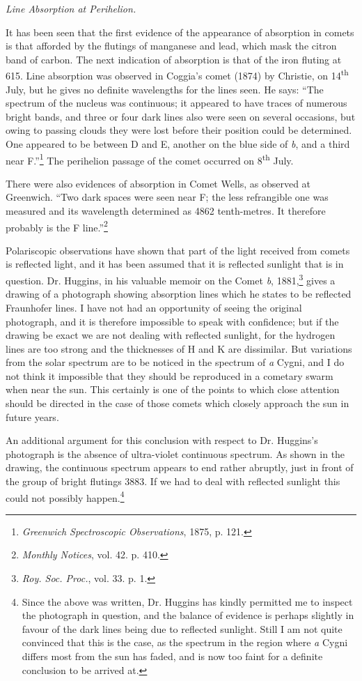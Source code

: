 \documentclass[a4paper, 12pt, oneside, polutonikogreek, english]{article}
\begin{document}
\emph{Line Absorption at Perihelion.}

It has been seen that the first evidence of the appearance of absorption in comets is that afforded by the flutings of manganese and lead, which mask the citron band of carbon. The next indication of absorption is that of the iron fluting at 615. Line absorption was observed in Coggia's comet (1874) by Christie, on 14\textsuperscript{th} July, but he gives no definite wavelengths for the lines seen. He says: ``The spectrum of the nucleus was continuous; it appeared to have traces of numerous bright bands, and three or four dark lines also were seen on several occasions, but owing to passing clouds they were lost before their position could be determined. One appeared to be between D and E, another on the blue side of \emph{b}, and a third near F.''\footnote{\emph{Greenwich Spectroscopic Observations}, 1875, p. 121.} The perihelion passage of the comet occurred on 8\textsuperscript{th} July.

There were also evidences of absorption in Comet Wells, as observed at Greenwich. ``Two dark spaces were seen near F; the less refrangible one was measured and its wavelength determined as 4862 tenth-metres. It therefore probably is the F line.''\footnote{\emph{Monthly Notices}, vol. 42. p. 410.}

Polariscopic observations have shown that part of the light received from comets is reflected light, and it has been assumed that it is reflected sunlight that is in question. Dr. Huggins, in his valuable memoir on the Comet \emph{b}, 1881,\footnote{\emph{Roy. Soc. Proc.}, vol. 33. p. 1.} gives a drawing of a photograph showing absorption lines which he states to be reflected Fraunhofer lines. I have not had an opportunity of seeing the original photograph, and it is therefore impossible to speak with confidence; but if the drawing be exact we are not dealing with reflected sunlight, for the hydrogen lines are too strong and the thicknesses of H and K are dissimilar. But variations from the solar spectrum are to be noticed in the spectrum of \emph{a} Cygni, and I do not think it impossible that they should be reproduced in a cometary swarm when near the sun. This certainly is one of the points to which close attention should be directed in the case of those comets which closely approach the sun in future years.

An additional argument for this conclusion with respect to Dr. Huggins's photograph is the absence of ultra-violet continuous spectrum. As shown in the drawing, the continuous spectrum appears to end rather abruptly, just in front of the group of bright flutings 3883. If we had to deal with reflected sunlight this could not possibly happen.\footnote{Since the above was written, Dr. Huggins has kindly permitted me to inspect the photograph in question, and the balance of evidence is perhaps slightly in favour of the dark lines being due to reflected sunlight. Still I am not quite convinced that this is the case, as the spectrum in the region where \emph{a} Cygni differs most from the sun has faded, and is now too faint for a definite conclusion to be arrived at.}
\end{document}
